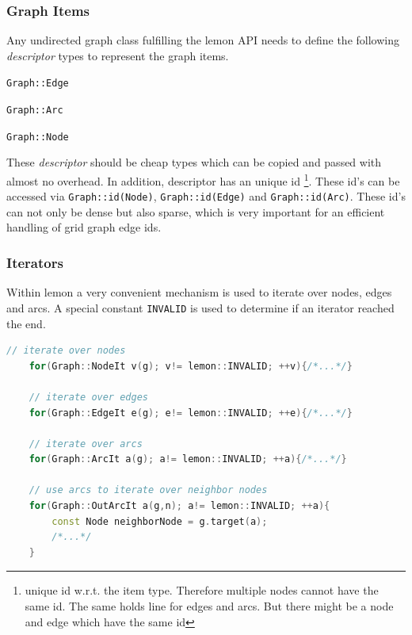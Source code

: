 \subsubsection{Graph Items}
    Any undirected graph class fulfilling the lemon API needs to define 
    the following \emph{descriptor} types to represent the graph items.
    \begin{compactitem}
    \item \lstinline{Graph::Edge}
    \item \lstinline{Graph::Arc}
    \item \lstinline{Graph::Node}
    \end{compactitem}
    These \emph{descriptor} should be cheap types which can be copied
    and passed with almost no overhead.
    In addition, descriptor has an unique id
    \footnote{ unique id w.r.t. the item type. 
    Therefore  multiple  nodes cannot have the same id.
    The same holds line for edges and arcs.
    But there might be a node and edge which have the same id}.
    These id's can be accessed via \lstinline{Graph::id(Node)}, \lstinline{Graph::id(Edge)} and \lstinline{Graph::id(Arc)}.
    These id's can not only be dense but also sparse, which is very
    important for an efficient handling of grid graph edge ids.



\subsubsection{Iterators}

    Within lemon a very convenient mechanism is used to iterate over
    nodes, edges and arcs.
    A special constant \lstinline{INVALID} is used to determine if 
    an iterator reached the end.

    \begin{minipage}{\textwidth}\vspace{-0.75cm}\begin{lstlisting}[language=c++]
    // iterate over nodes
    for(Graph::NodeIt v(g); v!= lemon::INVALID; ++v){/*...*/}

    // iterate over edges
    for(Graph::EdgeIt e(g); e!= lemon::INVALID; ++e){/*...*/}

    // iterate over arcs
    for(Graph::ArcIt a(g); a!= lemon::INVALID; ++a){/*...*/}

    // use arcs to iterate over neighbor nodes
    for(Graph::OutArcIt a(g,n); a!= lemon::INVALID; ++a){
        const Node neighborNode = g.target(a);
        /*...*/
    }
    \end{lstlisting}\end{minipage}\vspace{0.5cm}

